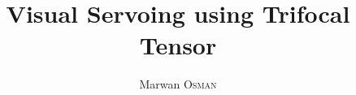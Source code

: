 \documentclass[a4paper,11pt]{article}
\title{Visual Servoing using Trifocal Tensor}
\author{Marwan \textsc{Osman}}
\date{}
\begin{document}
\maketitle

\tableofcontents
\newpage

%
%




\newpage

\nocite{*}

\end{document}
